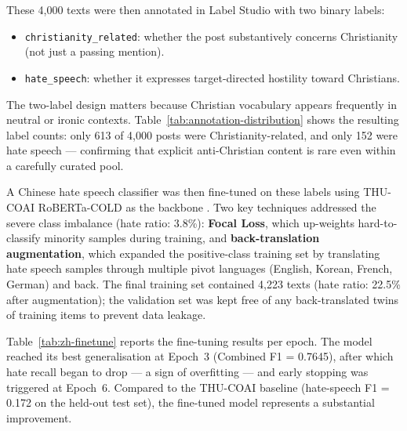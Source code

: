 \documentclass[../CLthesis.tex]{subfiles}
\begin{document}
These 4,000 texts were then annotated in Label Studio \citep{labelstudio} with two binary labels:
\begin{itemize}
  \item \texttt{christianity\_related}: whether the post substantively concerns Christianity (not just a passing mention).
  \item \texttt{hate\_speech}: whether it expresses target-directed hostility toward Christians.
\end{itemize}

The two-label design matters because Christian vocabulary appears frequently in neutral or ironic contexts. Table~\ref{tab:annotation-distribution} shows the resulting label counts: only 613 of 4,000 posts were Christianity-related, and only 152 were hate speech --- confirming that explicit anti-Christian content is rare even within a carefully curated pool.

A Chinese hate speech classifier was then fine-tuned on these labels using THU-COAI RoBERTa-COLD as the backbone \citep{thucoai-roberta-cold}. Two key techniques addressed the severe class imbalance (hate ratio: 3.8\%): \textbf{Focal Loss}, which up-weights hard-to-classify minority samples during training, and \textbf{back-translation augmentation}, which expanded the positive-class training set by translating hate speech samples through multiple pivot languages (English, Korean, French, German) and back. The final training set contained 4,223 texts (hate ratio: 22.5\% after augmentation); the validation set was kept free of any back-translated twins of training items to prevent data leakage.

Table~\ref{tab:zh-finetune} reports the fine-tuning results per epoch. The model reached its best generalisation at Epoch~3 (Combined F1 = 0.7645), after which hate recall began to drop --- a sign of overfitting --- and early stopping was triggered at Epoch~6. Compared to the THU-COAI baseline (hate-speech F1 = 0.172 on the held-out test set), the fine-tuned model represents a substantial improvement.
\end{document}
